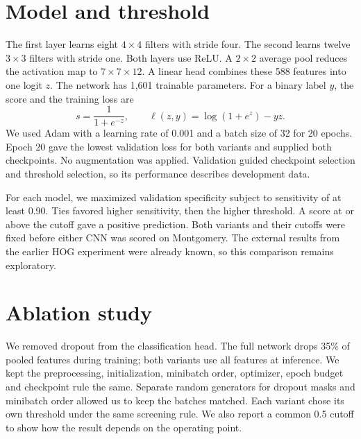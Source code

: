 \documentclass[11pt]{article}
\begin{document}
\section{Model and threshold}
The first layer learns eight $4\times4$ filters with stride four. The second learns twelve $3\times3$ filters with stride one. Both layers use ReLU. A $2\times2$ average pool reduces the activation map to $7\times7\times12$. A linear head combines these 588 features into one logit $z$. The network has 1,601 trainable parameters. For a binary label $y$, the score and the training loss are
\[
s=\frac{1}{1+e^{-z}}, \qquad \ell(z,y)=\log(1+e^z)-yz.
\]
We used Adam with a learning rate of 0.001 and a batch size of 32 for 20 epochs. Epoch 20 gave the lowest validation loss for both variants and supplied both checkpoints. No augmentation was applied. Validation guided checkpoint selection and threshold selection, so its performance describes development data.

For each model, we maximized validation specificity subject to sensitivity of at least 0.90. Ties favored higher sensitivity, then the higher threshold. A score at or above the cutoff gave a positive prediction. Both variants and their cutoffs were fixed before either CNN was scored on Montgomery. The external results from the earlier HOG experiment were already known, so this comparison remains exploratory.

\section{Ablation study}
We removed dropout from the classification head. The full network drops 35\% of pooled features during training; both variants use all features at inference. We kept the preprocessing, initialization, minibatch order, optimizer, epoch budget and checkpoint rule the same. Separate random generators for dropout masks and minibatch order allowed us to keep the batches matched. Each variant chose its own threshold under the same screening rule. We also report a common 0.5 cutoff to show how the result depends on the operating point.
\end{document}
